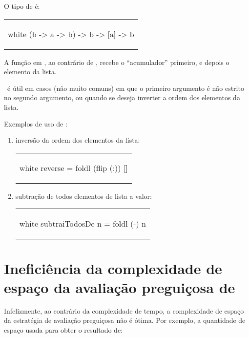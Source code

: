 O tipo de  é:

\begin{center}
\begin{tabular}{l}
\begin{alg}{.5\textwidth}{white}
  (b -> a -> b) -> b -> [a] -> b
\end{alg}
\end{tabular}
\end{center}

A função  em , ao contrário de , recebe
o ``acumulador'' primeiro, e depois o elemento da lista.

\fold\ é útil em casos (não muito comuns) em que o primeiro argumento
é não estrito no segundo argumento, ou quando se deseja inverter a
ordem dos elementos da lista.

Exemplos de uso de \foldl:

\begin{enumerate}

\item inversão da ordem dos elementos da lista:

\begin{center}
\begin{tabular}{l}
\begin{alg}{.2\textwidth}{white}
    reverse = foldl (flip (:)) []
\end{alg}
\end{tabular}
\end{center}

\item subtração de todos elementos de lista a valor:

\begin{center}
\begin{tabular}{l}
\begin{alg}{.2\textwidth}{white}
  subtraiTodosDe n = foldl (-) n
\end{alg}
\end{tabular}
\end{center}

\end{enumerate}

\section{Ineficiência da complexidade de espaço da avaliação preguiçosa de \foldl}

Infelizmente, ao contrário da complexidade de tempo, a complexidade de
espaço da estratégia de avaliação preguiçosa não é ótima. Por exemplo,
a quantidade de espaço usada para obter o resultado de:

